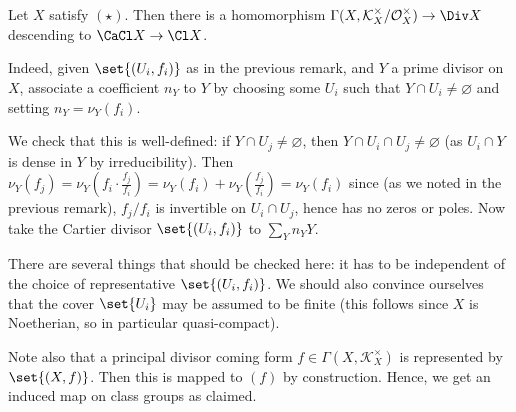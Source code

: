 Let $X$ satisfy $(\star)$. Then there is a homomorphism
$\Gamma(X, \mathcal{K}_X^\times/\mathcal{O}_X^\times)\to \Div X$
descending to $\CaCl X\to \Cl X$.

Indeed, given $\set{(U_i, f_i)}$ as in the previous remark, and $Y$ a prime divisor
on $X$, associate a coefficient $n_Y$ to $Y$ by choosing some $U_i$ such that
$Y\cap U_i\neq\varnothing$ and setting $n_Y = \nu_Y(f_i)$.

We check that this is well-defined: if $Y\cap U_j\neq\varnothing$, then $Y\cap U_i\cap U_j\neq\varnothing$
(as $U_i\cap Y$ is dense in $Y$ by irreducibility). Then $\nu_Y(f_j) = \nu_Y(f_i\cdot\frac{f_j}{f_i}) = \nu_Y(f_i) + \nu_Y(\frac{f_j}{f_i}) = \nu_Y(f_i)$
since (as we noted in the previous remark), $f_j/f_i$ is invertible on $U_i\cap U_j$,
hence has no zeros or poles. Now take the Cartier divisor $\set{(U_i, f_i)}$ to
$\sum_Y n_YY$.

There are several things that should be checked here: it has to be independent of
the choice of representative $\set{(U_i, f_i)}$. We should also convince ourselves
that the cover $\set{U_i}$ may be assumed to be finite (this follows since $X$
is Noetherian, so in particular quasi-compact).

Note also that a principal divisor coming form $f \in \Gamma(X, \mathcal{K}_X^\times)$
is represented by $\set{(X, f)}$. Then this is mapped to $(f)$ by construction.
Hence, we get an induced map on class groups as claimed.
